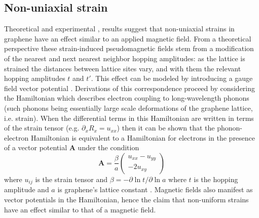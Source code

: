 \documentclass[edeposit,fullpage,draftthesis]{uiucthesis2009}
\begin{document}
        \subsection{Non-uniaxial strain}
        
        Theoretical \cite{manes2007symmetry, Guinea2009} and experimental \cite{Levy2010}, \cite{Yan2012} 
        results suggest that non-uniaxial strains in graphene have an effect similar to an applied magnetic field. 
        From a theoretical perspective these strain-induced pseudomagnetic fields stem from a modification 
        of the nearest and next nearest neighbor hopping amplitudes: as the lattice is strained the distances 
        between lattice sites vary, and with them the relevant hopping amplitudes $t$ and $t'$. 
        This effect can be modeled by introducing a gauge field vector potential \cite{manes2007symmetry}. 
        Derivations of this correspondence proceed by considering the Hamiltonian which describes
        electron coupling to long-wavelength phonons (such phonons being essentially large scale deformations
        of the graphene lattice, i.e. strain).
        When the differential terms in this Hamiltonian
        are written in terms of the strain tensor (e.g. $\partial_x R_x = u_{xx}$) then it can be shown
        that the phonon-electron Hamiltonian is equivalent to a Hamiltonian for electrons in the presence of
        a vector potential $\textbf{A}$ under the condition
        \begin{equation}
            \textbf{A} = \frac{\beta}{a} \left( \begin{matrix} u_{xx} - u_{yy} \\ -2u_{xy} \end{matrix} \right)
        \end{equation}
        where $u_{ij}$ is the strain tensor and $\beta = -\partial \ln t / \partial \ln a$
        where $t$ is the hopping amplitude and $a$ is graphene's lattice constant \cite{manes2007symmetry}. 
        Magnetic fields also manifest
        as vector potentials in the Hamiltonian, hence the claim that non-uniform strains have an
        effect similar to that of a magnetic field.
        
\end{document}
